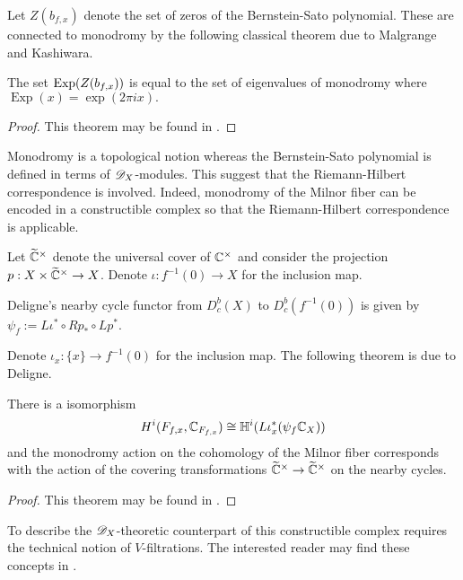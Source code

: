 Let $Z(b_{f,x})$ denote the set of zeros of the Bernstein-Sato polynomial.
These are connected to monodromy by the following classical theorem due to Malgrange and Kashiwara.
\begin{theorem}\label{thm: EigMonodromy}
  The set $\operatorname{Exp}(Z(b_{f,x}))$ is equal to the set of eigenvalues of monodromy where  $\operatorname{Exp}(x) = \exp(2\pi ix).$
\end{theorem}
\begin{proof}
  This theorem may be found in \cite{budur2015bernstein}.
\end{proof}
Monodromy is a topological notion whereas the Bernstein-Sato polynomial is defined in terms of $\mathscr{D}_X$-modules.
This suggest that the Riemann-Hilbert correspondence is involved.
Indeed, monodromy of the Milnor fiber can be encoded in a constructible complex so that the Riemann-Hilbert correspondence is applicable.

Let $\widetilde{\mathbb{C}}^\times$ denote the universal cover of $\mathbb{C}^\times$ and consider the projection $p:X\times \widetilde{\mathbb{C}}^\times \to X$.
Denote $\iota:f^{-1}(0)\to X$ for the inclusion map.
\begin{definition}
  Deligne's nearby cycle functor from $D^b_c(X)$ to $D_c^b(f^{-1}(0))$ is given by $\psi_f:= L\iota^* \circ Rp_*\circ Lp^*$.
\end{definition}
Denote $\iota_x:\{x\}\to f^{-1}(0)$ for the inclusion map.
The following theorem is due to Deligne.
\begin{theorem}
  There is a isomorphism
  $$H^i(F_{f,x}, \mathbb{C}_{F_{f,x}}) \cong \mathbb{H}^i(L\iota_x^* (\psi_f \mathbb{C}_X)) $$
  and the monodromy action on the cohomology of the Milnor fiber corresponds with the action of the covering transformations $\widetilde{\mathbb{C}}^\times \to \widetilde{\mathbb{C}}^\times$ on the nearby cycles.
\end{theorem}
\begin{proof}
  This theorem may be found in \cite{budur2015bernstein}.
\end{proof}
To describe the $\mathscr{D}_X$-theoretic counterpart of this constructible complex requires the technical notion of $V$-filtrations.
The interested reader may find these concepts in \cite{budur2015bernstein}.
